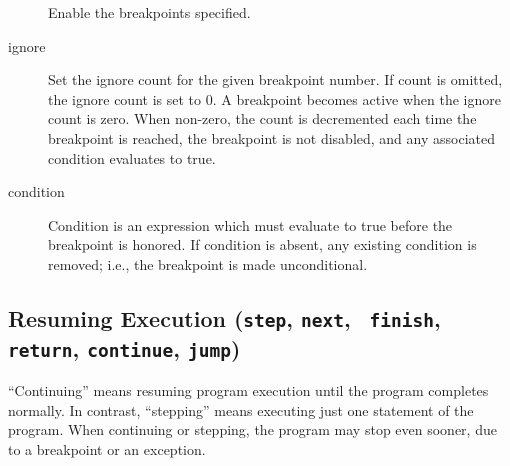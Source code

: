 \begin{description}
Enable the breakpoints specified.

\item[ignore \var{bpnumber} \optional{\var{count}}]

Set the ignore count for the given breakpoint number.  If count is
omitted, the ignore count is set to 0.  A breakpoint becomes active
when the ignore count is zero.  When non-zero, the count is
decremented each time the breakpoint is reached, the breakpoint is not
disabled, and any associated condition evaluates to true.

\item[condition \var{bpnumber} \optional{\var{condition}}]

Condition is an expression which must evaluate to true before
the breakpoint is honored.  If condition is absent, any existing
condition is removed; i.e., the breakpoint is made unconditional.

\end{description}

\subsection{Resuming Execution ({\tt step}, {\tt next}, {\tt
    finish}, {\tt return}, {\tt continue}, {\tt jump})\label{subsubsection-resume}}

``Continuing'' means resuming program execution until the program
completes normally.  In contrast, ``stepping'' means executing just
one statement of the program. When continuing or stepping, the program may stop even sooner, due to a breakpoint or an
exception.

